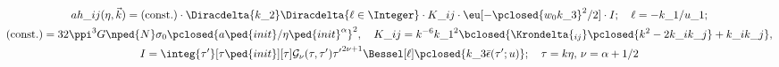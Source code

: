 \section{}

\begin{multline}
    ah\_{ij}(\eta, \vec{k}) = \text{(const.)} \cdot  \Diracdelta{k\_2} \Diracdelta{\ell\in \Integer} \cdot K\_{ij}\cdot \eu[-\pclosed{w_0 k\_3}^2/2] \cdot I; \quad \ell = -k\_1 /u\_1 ; \\
    \text{(const.)}= 32\ppi^3 G\nped{N} \sigma_0 {\pclosed{a\ped{init}/\eta\ped{init}^\alpha}}^2,\quad
    K\_{ij} = k^{-6} {k\_1}^2 \bclosed{ \Krondelta{_{ij}} \pclosed{k^2-2k\_i k\_j} + k\_i k\_j},\\
    I = \integ{\tau'}[\tau\ped{init}][\tau] \mathcal{G}_{\nu}(\tau, \tau') {\tau'}^{2\nu+1} \Bessel[\ell]\pclosed{k\_3 \bar{\epsilon}(\tau'; u)};\quad \tau=k\eta, \, \nu = \alpha+1/2
\end{multline}